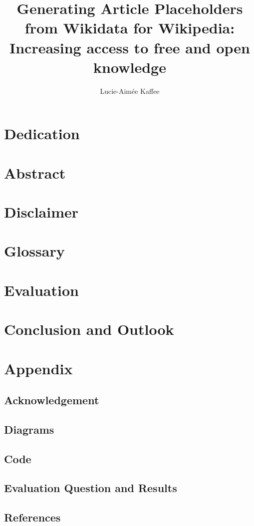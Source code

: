 \documentclass[11pt]{article}
\title{Generating Article Placeholders from Wikidata for Wikipedia:\\Increasing access to free and open knowledge}
\author{Lucie-Aim\'{e}e Kaffee}
\date{}
\begin{document}
\linenumbers
\maketitle
\newpage

\section*{Dedication}
\section*{Abstract}
\section*{Disclaimer}
\newpage

\tableofcontents


\section{Glossary}


\newpage

\newpage

\section{Evaluation}
\section{Conclusion and Outlook}
\section{Appendix}
	\subsection{Acknowledgement}
	\subsection{Diagrams}
	\subsection{Code}
	\subsection{Evaluation Question and Results}
	\subsection{References}
\end{document}
